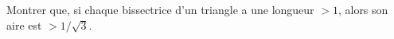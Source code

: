 Montrer que, si chaque bissectrice d'un triangle a une longueur $> 1$, alors son aire est $> 1/\sqrt{3}$.
